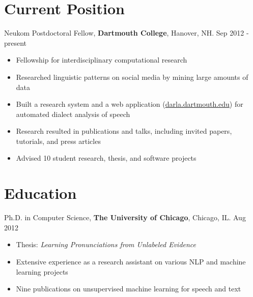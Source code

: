 \documentclass{res}
\begin{document}
 
 
 
\address{HB 6220, Dartmouth College \\ Hanover, NH 03755\\ 781-985-8237   }
\address{\href{mailto:sravana@cs.dartmouth.edu}{sravana@cs.dartmouth.edu}\\
\url{http://www.cs.dartmouth.edu/~sravana}}


 
\begin{resume} 

\section{Current Position}

Neukom Postdoctoral Fellow, {\bf Dartmouth College}, Hanover, NH. \hfill Sep 2012 - present
\begin{itemize}[noitemsep]
\item Fellowship for interdisciplinary computational research
\item Researched linguistic patterns on social media by mining large amounts of data
\item Built a  research system and a web application (\href{http://darla.dartmouth.edu}{darla.dartmouth.edu}) for  automated dialect  analysis of speech  
\item Research resulted in publications and talks, including invited papers, tutorials, and press articles
\item Advised 10 student research, thesis, and software projects
\end{itemize}

\section{Education}

Ph.D. in Computer Science, {\bf The University of Chicago}, Chicago, IL. \hfill Aug 2012 
\begin{itemize}[noitemsep]
\item Thesis: {\em Learning Pronunciations from Unlabeled Evidence}
\item Extensive experience as a research assistant on various NLP and machine learning projects
\item Nine publications on unsupervised machine learning for speech and text 
\end{itemize}


\end{resume}
\end{document}
